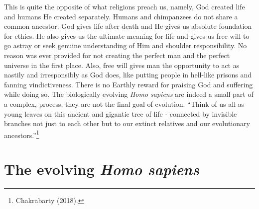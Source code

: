 \begin{multicols}{2}
This is quite the opposite of what religions preach us, namely, God created life and humans He created separately. Humans and chimpanzees do not share a common ancestor. God gives life after death and He gives us absolute foundation for ethics. He also gives us the ultimate meaning for life and gives us free will to go astray or seek genuine understanding of Him and shoulder responsibility. No reason was ever provided for not creating the perfect man and the perfect universe in the first place. Also, free will gives man the opportunity to act as nastily and irresponsibly as God does, like putting people in hell-like prisons and fanning vindictiveness. There is no Earthly reward for praising God and suffering while doing so. The biologically evolving \textit{Homo sapiens} are indeed a small part of a complex, process; they are not the final goal of evolution. “Think of us all as young leaves on this ancient and gigantic tree of life - connected by invisible branches not just to each other but to our extinct relatives and
our evolutionary ancestors.”\footnote{Chakrabarty (2018).}\\[-20pt]

\section{The evolving \textit{Homo sapiens}}


\end{multicols}
